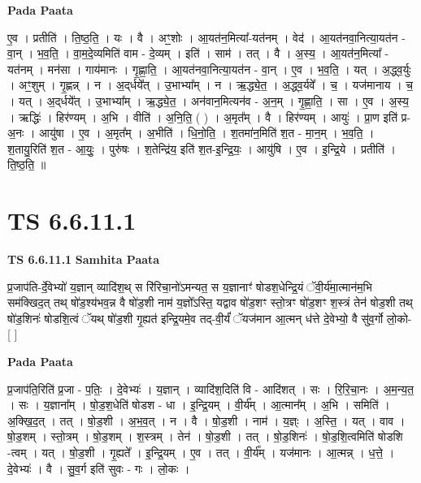 \documentclass[17pt]{extarticle}
\begin{document}
\textbf{Pada Paata} \newline

ए॒व । प्रतीति॑ । ति॒ष्ठ॒ति॒ । यः । वै । अꣳ॒॒शोः । आ॒यत॑न॒मित्या᳚-यत॑नम् । वेद॑ । आ॒यत॑नवा॒नित्या॒यत॑न - वा॒न् । भ॒व॒ति॒ । वा॒म॒दे॒व्यमिति॑ वाम - दे॒व्यम् । इति॑ । साम॑ । तत् । वै । अ॒स्य॒ । आ॒यत॑न॒मित्या᳚ - यत॑नम् । मन॑सा । गाय॑मानः । गृ॒ह्णा॒ति॒ । आ॒यत॑नवा॒नित्या॒यत॑न - वा॒न् । ए॒व । भ॒व॒ति॒ । यत् । अ॒द्ध्व॒र्युः । अꣳ॒॒शुम् । गृ॒ह्णन्न् । न । अ॒द्‌र्धये᳚त् । उ॒भाभ्या᳚म् । न । ऋ॒द्ध्ये॒त॒ । अ॒द्ध्व॒र्यवे᳚ । च॒ । यज॑मानाय । च॒ । यत् । अ॒द्‌र्धये᳚त् । उ॒भाभ्या᳚म् । ऋ॒द्ध्ये॒त॒ । अन॑वान॒मित्यन॑व - अ॒न॒म् । गृ॒ह्णा॒ति॒ । सा । ए॒व । अ॒स्य॒ । ऋद्धिः॑ । हिर॑ण्यम् । अ॒भि । वीति॑ । अ॒नि॒ति॒ ( ) । अ॒मृत᳚म् । वै । हिर॑ण्यम् । आयुः॑ । प्रा॒ण इति॑ प्र-अ॒नः । आयु॑षा । ए॒व । अ॒मृत᳚म् । अ॒भीति॑ । धि॒नो॒ति॒ । श॒तमा॑न॒मिति॑ श॒त - मा॒न॒म् । भ॒व॒ति॒ । श॒तायु॒रिति॑ श॒त - आ॒युः॒ । पुरु॑षः । श॒तेन्द्रि॑य॒ इति॑ श॒त-इ॒न्द्रि॒यः॒ । आयु॑षि । ए॒व । इ॒न्द्रि॒ये । प्रतीति॑ । ति॒ष्ठ॒ति॒ ॥  \newline





\section{ TS 6.6.11.1 }

\textbf{TS 6.6.11.1 } \newline
\textbf{Samhita Paata} \newline

प्र॒जाप॑ति-र्दे॒वेभ्यो॑ य॒ज्ञान् व्यादि॑श॒थ् स रि॑रिचा॒नो॑ऽमन्यत॒ स य॒ज्ञानाꣳ॑ षोडश॒धेन्द्रि॒यं ॅवी॒र्य॑मा॒त्मान॑म॒भि सम॑क्खिद॒त् तथ् षो॑ड॒श्य॑भव॒न्न वै षो॑ड॒शी नाम॑ य॒ज्ञो᳚ऽस्ति॒ यद्वाव षो॑ड॒शꣳ स्तो॒त्रꣳ षो॑ड॒शꣳ श॒स्त्रं तेन॑ षोड॒शी तथ् षो॑ड॒शिनः॑ षोडशि॒त्वं ॅयथ् षो॑ड॒शी गृ॒ह्यत॑ इन्द्रि॒यमे॒व तद्-वी॒र्यं॑ ॅयज॑मान आ॒त्मन् ध॑त्ते दे॒वेभ्यो॒ वै सु॑व॒र्गो लो॒को- [  ] \newline

\textbf{Pada Paata} \newline

प्र॒जाप॑ति॒रिति॑ प्र॒जा - प॒तिः॒ । दे॒वेभ्यः॑ । य॒ज्ञान् । व्यादि॑श॒दिति॑ वि - आदि॑शत् । सः । रि॒रि॒चा॒नः । अ॒म॒न्य॒त॒ । सः । य॒ज्ञाना᳚म् । षो॒ड॒श॒धेति॑ षोडश - धा । इ॒न्द्रि॒यम् । वी॒र्य᳚म् । आ॒त्मान᳚म् । अ॒भि । समिति॑ । अ॒क्खि॒द॒त् । तत् । षो॒ड॒शी । अ॒भ॒व॒त् । न । वै । षो॒ड॒शी । नाम॑ । य॒ज्ञ्ः । अ॒स्ति॒ । यत् । वाव । षो॒ड॒शम् । स्तो॒त्रम् । षो॒ड॒शम् । श॒स्त्रम् । तेन॑ । षो॒ड॒शी । तत् । षो॒ड॒शिनः॑ । षो॒ड॒शि॒त्वमिति॑ षोडशि -त्वम् । यत् । षो॒ड॒शी । गृ॒ह्यते᳚ । इ॒न्द्रि॒यम् । ए॒व । तत् । वी॒र्य᳚म् । यज॑मानः । आ॒त्मन्न् । ध॒त्ते॒ । दे॒वेभ्यः॑ । वै । सु॒व॒र्ग इति॑ सुवः - गः । लो॒कः ।  \newline
\end{document}
